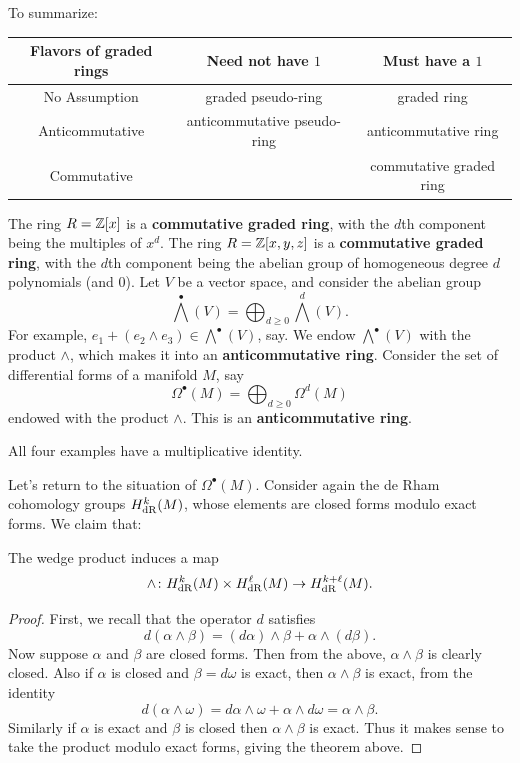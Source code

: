 To summarize:
\begin{center}
	\small
	\begin{tabular}[h]{|c|cc|}
		\hline
		\textbf{Flavors of graded rings} &
		Need not have $1$ & Must have a $1$ \\ \hline
		No Assumption & graded pseudo-ring & graded ring \\
		Anticommutative & anticommutative pseudo-ring & anticommutative ring \\
		Commutative &  & commutative graded ring \\ \hline
	\end{tabular}
\end{center}

\begin{example}
	\listhack
	\begin{enumerate}[(a)]
		\ii The ring $R = \mathbb Z[x]$ is a \textbf{commutative graded ring},
		with the $d$th component being the multiples of $x^d$.
		\ii The ring $R = \mathbb Z[x,y,z]$ is a \textbf{commutative graded ring},
		with the $d$th component being the abelian group
		of homogeneous degree $d$ polynomials (and $0$).
		\ii Let $V$ be a vector space, and consider
		the abelian group
		\[ \bigwedge^\bullet(V) = \bigoplus_{d \ge 0} \bigwedge^d(V). \]
		For example, $e_1 + (e_2 \wedge e_3) \in \bigwedge^\bullet(V)$, say.
		We endow $\bigwedge^\bullet(V)$ with the product $\wedge$,
		which makes it into an \textbf{anticommutative ring}.
		\ii Consider the set of differential forms of a manifold $M$,
		say \[ \Omega^\bullet(M) = \bigoplus_{d \ge 0} \Omega^d(M) \]
		endowed with the product $\wedge$.
		This is an \textbf{anticommutative ring}.
	\end{enumerate}
	All four examples have a multiplicative identity.
\end{example}

Let's return to the situation of $\Omega^\bullet(M)$.
Consider again the de Rham cohomology groups $H_{\mathrm{dR}}^k(M)$,
whose elements are closed forms modulo exact forms.
We claim that:
\begin{lemma}
	The wedge product induces a map
	\[ \wedge \colon H_{\mathrm{dR}}^k(M) \times H_{\mathrm{dR}}^\ell(M) \to H_{\mathrm{dR}}^{k+\ell}(M). \]
\end{lemma}
\begin{proof}
	First, we recall that the operator $d$ satisfies
	\[
		d(\alpha \wedge \beta)
		= (d\alpha) \wedge \beta + \alpha \wedge (d\beta).
	\]
	Now suppose $\alpha$ and $\beta$ are closed forms.
	Then from the above, $\alpha \wedge \beta$ is clearly closed.
	Also if $\alpha$ is closed and $\beta = d\omega$ is exact,
	then $\alpha \wedge \beta$ is exact, from the identity
	\[ d(\alpha \wedge \omega)
		= d\alpha \wedge\omega + \alpha \wedge d\omega = \alpha \wedge \beta. \]
	Similarly if $\alpha$ is exact and $\beta$ is closed
	then $\alpha \wedge \beta$ is exact.
	Thus it makes sense to take the product modulo exact forms,
	giving the theorem above.
\end{proof}

